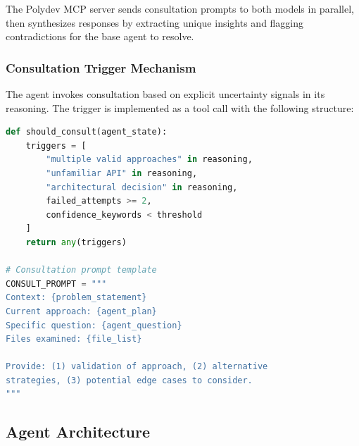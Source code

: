 \documentclass[11pt,a4paper]{article}
\begin{document}
\begin{table}[h]
\centering
\caption{Polydev Consultation Models (Pricing retrieved December 2025)}
\label{tab:consultation_models}
\end{table}

The Polydev MCP server sends consultation prompts to both models in parallel, then synthesizes responses by extracting unique insights and flagging contradictions for the base agent to resolve.

\subsubsection{Consultation Trigger Mechanism}

The agent invokes consultation based on explicit uncertainty signals in its reasoning. The trigger is implemented as a tool call with the following structure:

\begin{lstlisting}[language=Python, caption=Consultation Trigger Pseudocode]
def should_consult(agent_state):
    triggers = [
        "multiple valid approaches" in reasoning,
        "unfamiliar API" in reasoning,
        "architectural decision" in reasoning,
        failed_attempts >= 2,
        confidence_keywords < threshold
    ]
    return any(triggers)

# Consultation prompt template
CONSULT_PROMPT = """
Context: {problem_statement}
Current approach: {agent_plan}
Specific question: {agent_question}
Files examined: {file_list}

Provide: (1) validation of approach, (2) alternative 
strategies, (3) potential edge cases to consider.
"""
\end{lstlisting}

\subsection{Agent Architecture}
\end{document}
